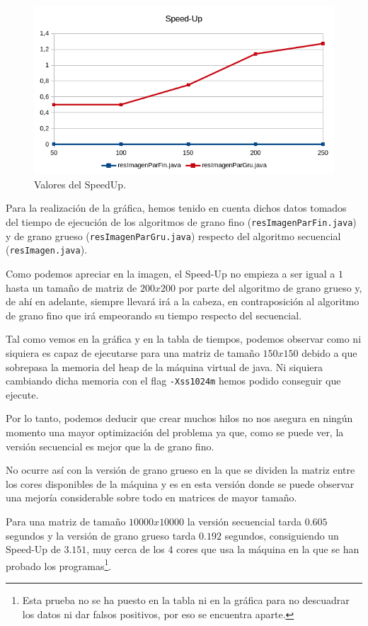 \documentclass[12pt,letterpaper]{article}
\begin{document}
\begin{figure}[h]
	\begin{center}
		\includegraphics[scale=1]{SpeedUp2.png}
		\caption{Valores del SpeedUp.}
		\label{fig:Valores del SpeedUp}
	\end{center}
\end{figure}
Para la realización de la gráfica, hemos tenido en cuenta dichos datos tomados del tiempo de ejecución de los algoritmos de grano fino (\texttt{resImagenParFin.java}) y de grano grueso (\texttt{resImagenParGru.java}) respecto del algoritmo secuencial (\texttt{resImagen.java}).

Como podemos apreciar en la imagen, el Speed-Up no empieza a ser igual a $1$ hasta un tamaño de matriz de  $200x200$ por parte del algoritmo de grano grueso y, de ahí en adelante, siempre llevará irá a la cabeza, en contraposición al algoritmo de grano fino que irá empeorando su tiempo respecto del secuencial.

Tal como vemos en la gráfica y en la tabla de tiempos, podemos observar como ni siquiera es capaz de ejecutarse para una matriz de tamaño $150x150$ debido a que sobrepasa la memoria del heap de la máquina virtual de java. Ni siquiera cambiando dicha memoria con el flag \texttt{-Xss1024m} hemos podido conseguir que ejecute.

Por lo tanto, podemos deducir que crear muchos hilos no nos asegura en ningún momento una mayor optimización del problema ya que, como se puede ver, la versión secuencial es mejor que la de grano fino.

No ocurre así con la versión de grano grueso en la que se dividen la matriz entre los cores disponibles de la máquina y es en esta versión donde se puede observar una mejoría considerable sobre todo en matrices de mayor tamaño.

Para una matriz de tamaño $10000x10000$ la versión secuencial tarda $0.605$ segundos y la versión de grano grueso tarda $0.192$ segundos, consiguiendo un Speed-Up de $3.151$, muy cerca de los 4 cores que usa la máquina en la que se han probado los programas\footnote{Esta prueba no se ha puesto en la tabla ni en la gráfica para no descuadrar los datos ni dar falsos positivos, por eso se encuentra aparte.}.
\end{document}
